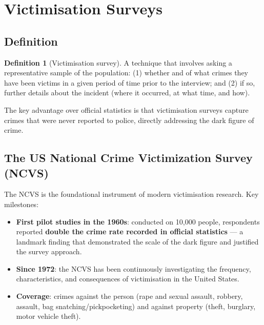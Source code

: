 \documentclass[11pt,a4paper,openany]{report}
\theoremstyle{definition}
\newtheorem{definition}{Definition}[chapter]
\theoremstyle{plain}
\theoremstyle{remark}
\begin{document}
\section{Victimisation Surveys}

\subsection{Definition}

\begin{definition}[Victimisation survey]
A technique that involves asking a representative sample of the population: (1) whether and of what crimes they have been victims in a given period of time prior to the interview; and (2) if so, further details about the incident (where it occurred, at what time, and how).
\end{definition}

The key advantage over official statistics is that victimisation surveys capture crimes that were never reported to police, directly addressing the dark figure of crime.

\subsection{The US National Crime Victimization Survey (NCVS)}

The NCVS is the foundational instrument of modern victimisation research. Key milestones:

\begin{itemize}
    \item \textbf{First pilot studies in the 1960s}: conducted on 10,000 people, respondents reported \textbf{double the crime rate recorded in official statistics} --- a landmark finding that demonstrated the scale of the dark figure and justified the survey approach.
    \item \textbf{Since 1972}: the NCVS has been continuously investigating the frequency, characteristics, and consequences of victimisation in the United States.
    \item \textbf{Coverage}: crimes against the person (rape and sexual assault, robbery, assault, bag snatching/pickpocketing) and against property (theft, burglary, motor vehicle theft).
\end{itemize}
\end{document}
